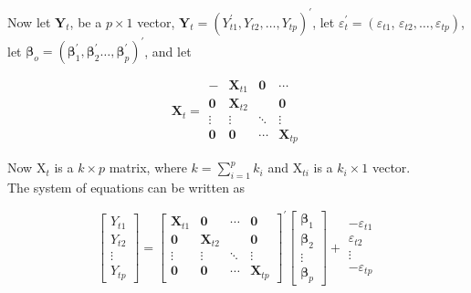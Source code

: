 \documentclass[10pt]{article}
\begin{document}
Now let $\mathbf{Y}_{t}$, be a $p \times 1$ vector, $\mathbf{Y}_{t}=\left(Y_{t 1}^{\prime}, Y_{t 2}, \ldots, Y_{t p}\right)^{\prime}$, let $\varepsilon_{t}^{\prime}=\left(\varepsilon_{t 1}\right.$, $\left.\varepsilon_{t 2}, \ldots, \varepsilon_{t p}\right)$, let $\boldsymbol{\beta}_{o}=\left(\boldsymbol{\beta}_{1}^{\prime}, \boldsymbol{\beta}_{2}^{\prime} \ldots, \boldsymbol{\beta}_{p}^{\prime}\right)^{\prime}$, and let

$$
\mathbf{X}_{t}=\begin{array}{cccc}
- & \mathbf{X}_{t 1} & \mathbf{0} & \cdots \\
\mathbf{0} & \mathbf{X}_{t 2} & & \mathbf{0} \\
\vdots & \vdots & \ddots & \vdots \\
\mathbf{0} & \mathbf{0} & \cdots & \mathbf{X}_{t p}
\end{array}
$$

Now $\mathrm{X}_{t}$ is a $k \times p$ matrix, where $k=\sum_{i=1}^{p} k_{i}$ and $\mathrm{X}_{t i}$ is a $k_{i} \times 1$ vector.\\
The system of equations can be written as

$$
\left[\begin{array}{c}
Y_{t 1} \\
Y_{t 2} \\
\vdots \\
Y_{t p}
\end{array}\right]=\left[\begin{array}{cccc}
\mathbf{X}_{t 1} & \mathbf{0} & \cdots & \mathbf{0} \\
\mathbf{0} & \mathbf{X}_{t 2} & & \mathbf{0} \\
\vdots & \vdots & \ddots & \vdots \\
\mathbf{0} & \mathbf{0} & \cdots & \mathbf{X}_{t p}
\end{array}\right]^{\prime}\left[\begin{array}{c}
\boldsymbol{\beta}_{1} \\
\boldsymbol{\beta}_{2} \\
\vdots \\
\boldsymbol{\beta}_{p}
\end{array}\right]+\begin{gathered}
-\varepsilon_{t 1} \\
\varepsilon_{t 2} \\
\vdots \\
-\varepsilon_{t p}
\end{gathered}
$$
\end{document}

